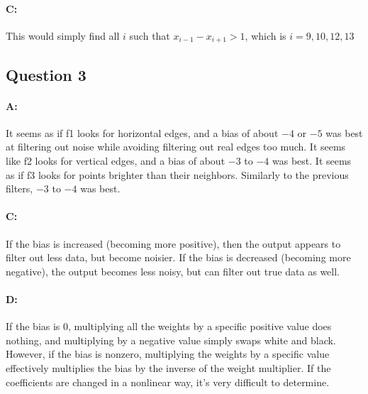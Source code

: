 \documentclass{article}
\begin{document}
\paragraph{C: } This would simply find all $i$ such that $x_{i-1}-x_{i+1}>1$, which is $i=9, 10, 12, 13$

\subsection{Question 3}

\paragraph{A: } It seems as if f1 looks for horizontal edges, and a bias of about $-4$ or $-5$ was best at filtering out noise while avoiding filtering out real edges too much. \newline
It seems like f2 looks for vertical edges, and a bias of about $-3$ to $-4$ was best. \newline
It seems as if f3 looks for points brighter than their neighbors. Similarly to the previous filters, $-3$ to $-4$ was best.

\paragraph{C: } If the bias is increased (becoming more positive), then the output appears to filter out less data, but become noisier. If the bias is decreased (becoming more negative), the output becomes less noisy, but can filter out true data as well.

\paragraph{D: } If the bias is $0$, multiplying all the weights by a specific positive value does nothing, and multiplying by a negative value simply swaps white and black. However, if the bias is nonzero, multiplying the weights by a specific value effectively multiplies the bias by the inverse of the weight multiplier. If the coefficients are changed in a nonlinear way, it's very difficult to determine.
\end{document}
